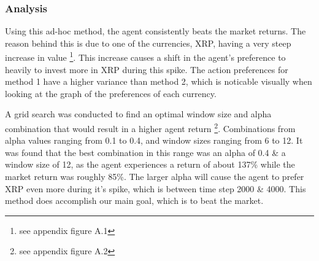 \documentclass[a4paper,12pt]{article}
\begin{document}
\subsubsection{Analysis}
Using this ad-hoc method, the agent consistently beats the market returns. The reason behind this is due to one of the currencies, XRP, having a very steep increase in value \footnote{see appendix figure A.1}. This increase causes a shift in the agent’s preference to heavily to invest more in XRP during this spike. The action preferences for method 1 have a higher variance than method 2, which is noticable visually when looking at the graph of the preferences of each currency. 

A grid search was conducted to find an optimal window size and alpha combination that would result in a higher agent return \footnote{see appendix figure A.2}. Combinations from alpha values ranging from 0.1 to 0.4, and window sizes ranging from 6 to 12. It was found that the best combination in this range was an alpha of 0.4 \& a window size of 12, as the agent experiences a return of about 137\% while the market return was roughly 85\%. The larger alpha will cause the agent to prefer XRP even more during it’s spike, which is between time step 2000 \& 4000.
This method does accomplish our main goal, which is to beat the market.
\end{document}
